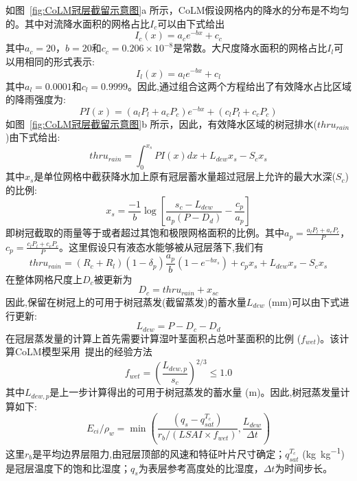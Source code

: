 如图~\ref{fig:CoLM冠层截留示意图}a 所示，CoLM假设网格内的降水的分布是不均匀的。其中对流降水面积的网格占比$I_c$可以由下式给出
\begin{equation}
I_{c}(x)=a_{c} e^{-bx}+c_{c}
\end{equation}
其中$a_c=20$，$b=20$和$c_c=0.206\times10^{-8}$是常数。大尺度降水面积的网格占比$I_l$可以用相同的形式表示:
\begin{equation}
I_{l}(x)=a_{l} e^{-b x}+c_{l}
\end{equation}
其中$a_l=0.0001$和$c_l=0.9999$。因此,通过组合这两个方程给出了有效降水占比区域的降雨强度为:
\begin{equation}
P I(x)=\left(a_{l} P_{l}+a_{c} P_{c}\right) e^{-b x}+\left(c_{l} P_{l}+c_{c} P_{c}\right)
\end{equation}
如图~\ref{fig:CoLM冠层截留示意图}b 所示，因此，有效降水区域的树冠排水($thru_{rain}$)由下式给出:
\begin{equation}
thru_{rain}=\int_{0}^{x_{s}} P I(x) d x+L_{dew} x_{s}-S_{c} x_{s}
\end{equation}
其中$x_s$是单位网格中截获降水加上原有冠层蓄水量超过冠层上允许的最大水深($S_c$)的比例:
\begin{equation}
x_{s}=\frac{-1}{b} \log \left[\frac{s_{c}-L_{d e w}}{a_{p}\left(P-D_{d}\right)}-\frac{c_{p}}{a_{p}}\right]
\end{equation}
即树冠截取的雨量等于或者超过其饱和极限网格面积的比例。其中$a_p=\frac{a_lP_l+a_cP_c}{P}$，$c_p=\frac{c_lP_l+c_cP_c}{P}$。这里假设只有液态水能够被从冠层落下,我们有
\begin{equation}
thru_{rain}=\left(R_{c}+R_{l}\right)\left(1-\delta_{p}\right) \frac{a_{p}}{b}\left(1-e^{-b x_{s}}\right)+c_{p} x_{s}+L_{dew} x_{s}-S_{c} x_{s}
\end{equation}
在整体网格尺度上$D_c$被更新为
\begin{equation}
D_c=thru_{r a i n}+x_{s c}
\end{equation}
因此,保留在树冠上的可用于树冠蒸发(截留蒸发)的蓄水量$L_{dew}$ (mm)可以由下式进行更新:
\begin{equation}
L_{dew}={P}-D_{c}-D_{d}
\end{equation}
在冠层蒸发量的计算上首先需要计算湿叶茎面积占总叶茎面积的比例 ($f_{wet}$)。该计算CoLM模型采用~\citet{dickinson1993biosphere}提出的经验方法
\begin{equation}
f_{{wet}}=\left(\frac{L_{dew, p}}{s_{c}}\right)^{2 / 3} \leqslant 1.0
\end{equation}
其中$L_{dew, p}$是上一步计算得出的可用于树冠蒸发的蓄水量 (m)。因此,树冠蒸发量计算如下:
\begin{equation}
E_{ci} / \rho_{w}=\min \left(\frac{\left(q_{s}-q_{sat}^{T_{c}}\right)}{r_{b} /\left(LSAI \times f_{wet}\right)}, \frac{L_{dew}}{\Delta t}\right)
\end{equation}
这里$r_b$是平均边界层阻力,由冠层顶部的风速和特征叶片尺寸确定；$q_{sat}^{T_c}$ (\unit{kg.kg^{-1}})是冠层温度下的饱和比湿度；$q_s$为表层参考高度处的比湿度，$\Delta t$为时间步长。


